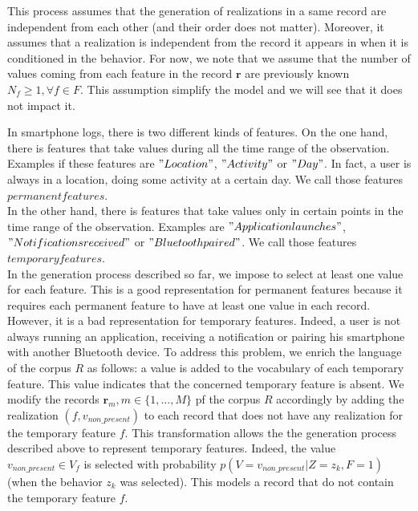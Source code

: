 This process assumes that the generation of realizations in a same record are independent from each other (and their order does not matter). Moreover, it assumes that a realization is independent from the record it appears in when it is conditioned in the behavior. For now, we note that we assume that the number of values coming from each feature in the record $\mathbf{r}$ are previously known $N_{f}\geq 1,\forall f\in F$. This assumption simplify the model and we will see that it does not impact it. \par

In smartphone logs, there is two different kinds of features. On the one hand, there is features that take values during all the time range of the observation. Examples if these features are $"Location"$, $"Activity"$ or $"Day"$. In fact, a user is always in a location, doing some activity at a certain day. We call those features $permanent features$.
\\In the other hand, there is features that take values only in certain points in the time range of the observation. Examples are $"Application launches"$, $"Notifications received"$ or $"Bluetooth paired"$. We call those features $temporary features$.
\\In the generation process described so far, we impose to select at least one value for each feature. This is a good representation for permanent features because it requires each permanent feature to have at least one value in each record. However, it is a bad representation for temporary features. Indeed, a user is not always running an application, receiving a notification or pairing his smartphone with another Bluetooth device. To address this problem, we enrich the language of the corpus $R$ as follows: a value is added to the vocabulary of each temporary feature. This value indicates that the concerned temporary feature is absent. We modify the records $\mathbf{r}_{m}, m\in\{1,...,M\}$ pf the corpus $R$ accordingly by adding the realization $(f, v_{non\_present})$ to each record that does not have any realization for the temporary feature $f$. This transformation allows the the generation process described above to represent temporary features. Indeed, the value $v_{non\_present} \in V_{f}$ is selected with probability $p(V=v_{non\_present}|Z=z_{k},F=1)$ (when the behavior $z_{k}$ was selected). This models a record that do not contain the temporary feature $f$. \par

